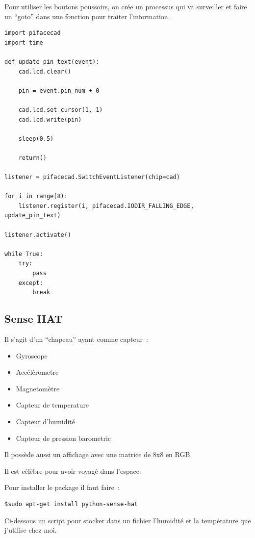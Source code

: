 Pour utiliser les boutons poussoirs, on crée un processus qui va surveiller et faire un ``goto'' dans une fonction pour traiter l'information.

\begin{verbatim}
import pifacecad
import time

def update_pin_text(event):
    cad.lcd.clear()   
     
    pin = event.pin_num + 0
    
    cad.lcd.set_cursor(1, 1)        
    cad.lcd.write(pin)
    
    sleep(0.5)
    
    return()    

listener = pifacecad.SwitchEventListener(chip=cad)

for i in range(8):
    listener.register(i, pifacecad.IODIR_FALLING_EDGE, update_pin_text)

listener.activate()

while True:
    try:
        pass
    except:
        break
\end{verbatim}

\subsection{Sense HAT}

Il s'agit d'un ``chapeau'' ayant comme capteur~:
\begin{itemize}
    \item Gyroscope
    \item Accélèrometre
    \item Magnetomètre
    \item Capteur de temperature
    \item Capteur d'humidité
    \item Capteur de pression barometric
\end{itemize}

Il possède aussi un affichage avec une matrice de 8x8 en RGB.

Il est célèbre pour avoir voyagé dans l'espace.

Pour installer le package il faut faire~:
\begin{verbatim}
$sudo apt-get install python-sense-hat
\end{verbatim}

Ci-dessous un script pour stocker dans un fichier l'humidité et la température que j'utilise chez moi.

